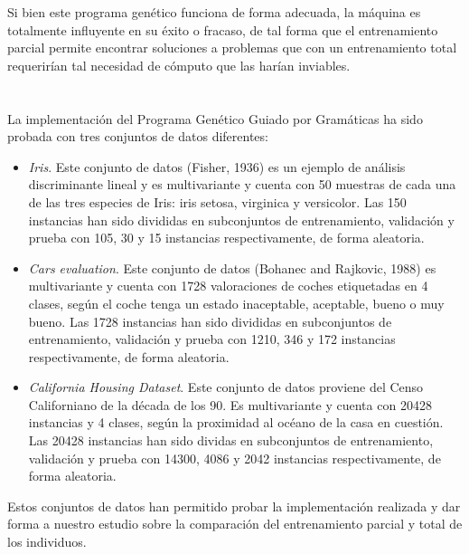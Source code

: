 \documentclass[spanish,a4paper,12pt,twoside]{report}
\begin{document}
  Si bien este programa genético funciona de forma adecuada, la máquina es totalmente influyente en su éxito o fracaso, de tal forma que el entrenamiento parcial permite encontrar soluciones a problemas que con un entrenamiento total requerirían tal necesidad de cómputo que las harían inviables.
  
  \newpage\cleardoublepage

  \chapter{\vspace{-3cm}{\LARGE 7. Resultados}}
  \setcounter{figure}{17}
  \vspace{-1cm}
  La implementación del Programa Genético Guiado por Gramáticas ha sido probada con tres conjuntos de datos diferentes:
  \begin{itemize}
    \item \emph{Iris}. Este conjunto de datos (Fisher, 1936) es un ejemplo de análisis discriminante lineal y es multivariante y cuenta con 50 muestras de cada una de las tres especies de Iris: iris setosa, virginica y versicolor. Las 150 instancias han sido divididas en subconjuntos de entrenamiento, validación y prueba con 105, 30 y 15 instancias respectivamente, de forma aleatoria.
    \item \emph{Cars evaluation}. Este conjunto de datos (Bohanec and Rajkovic, 1988) es multivariante y cuenta con 1728 valoraciones de coches etiquetadas en 4 clases, según el coche tenga un estado inaceptable, aceptable, bueno o muy bueno. Las 1728 instancias han sido divididas en subconjuntos de entrenamiento, validación y prueba con 1210, 346 y 172 instancias respectivamente, de forma aleatoria.
    \item \emph{California Housing Dataset}. Este conjunto de datos proviene del Censo Californiano de la década de los 90. Es multivariante y cuenta con 20428 instancias y 4 clases, según la proximidad al océano de la casa en cuestión. Las 20428 instancias han sido dividas en subconjuntos de entrenamiento, validación y prueba con 14300, 4086 y 2042 instancias respectivamente, de forma aleatoria.
  \end{itemize} \par
  Estos conjuntos de datos han permitido probar la implementación realizada y dar forma a nuestro estudio sobre la comparación del entrenamiento parcial y total de los individuos. \par
\end{document}
